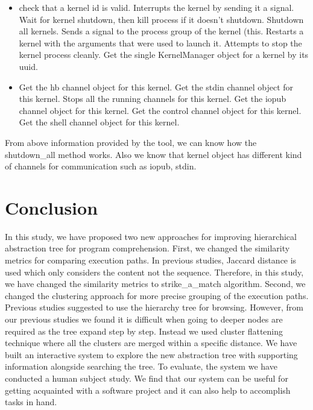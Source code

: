 \begin{itemize}
    \item check that a kernel id is valid. Interrupts the kernel by sending it a signal. Wait for kernel shutdown, then kill process if it doesn't shutdown. Shutdown all kernels. Sends a signal to the process group of the kernel (this. Restarts a kernel with the arguments that were used to launch it. Attempts to stop the kernel process cleanly. Get the single KernelManager object for a kernel by its uuid.
    \item Get the hb channel object for this kernel. Get the stdin channel object for this kernel. Stops all the running channels for this kernel. Get the iopub channel object for this kernel. Get the control channel object for this kernel. Get the shell channel object for this kernel.
    
\end{itemize}

From above information provided by the tool, we can know how the shutdown\_all method works. Also we know that kernel object has different kind of channels for communication such as iopub, stdin.  

\section{Conclusion}

In this study, we have proposed two new approaches for improving hierarchical abstraction tree for program comprehension. First, we changed the similarity metrics for comparing execution paths. In previous studies, Jaccard distance is used which only considers the content not the sequence. Therefore, in this study, we have changed the similarity metrics to strike\_a\_match algorithm. Second, we changed the clustering approach for more precise grouping of the execution paths. Previous studies suggested to use the hierarchy tree for browsing. However, from our previous studies we found it is difficult when going to deeper nodes are required as the tree expand step by step. Instead we used cluster flattening technique where all the clusters are merged within a specific distance. We have built an interactive system to explore the new abstraction tree with supporting information alongside searching the tree. To evaluate, the system we have conducted a human subject study. We find that our system can be useful for getting acquainted with a software project and it can also help to accomplish tasks in hand.  
